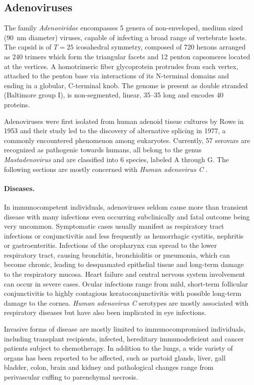 \subsection{Adenoviruses}
The family \textit{Adenoviridae} encompasses 5 genera of non-enveloped, medium sized (\SI{90}{\nano\meter} diameter) viruses, capable of infecting a broad range of vertebrate hosts. The capsid is of $T=25$ icosahedral symmetry, composed of 720 hexons arranged as 240 trimers which form the triangular facets and 12 penton capsomeres located at the vertices. A homotrimeric fiber glycoprotein protrudes from each vertex, attached to the penton base via interactions of its N-terminal domains and ending in a globular, C-terminal knob. The genome is present as double stranded  (Baltimore group I), is non-segmented, linear, 35--\SI{35}{\kilobase} long and encodes 40 proteins.

Adenoviruses were first isolated from human adenoid tissue cultures by Rowe in 1953 and their study led to the discovery of alternative splicing in 1977, a commonly encountered phenomenon among eukaryotes. Currently, 57 serovars are recognized as pathogenic towards humans, all belong to the genus \textit{Mastadenovirus} and are classified into 6 species, labeled A through G. The following sections are mostly concerned with \textit{Human adenovirus C} \citep{Lenaerts2008}.

\paragraph{Diseases.}
In immunocompetent individuals, adenoviruses seldom cause more than transient disease with many infections even occurring subclinically and fatal outcome being very uncommon. Symptomatic cases usually manifest as respiratory tract infections or conjunctivitis and less frequently as hemorrhagic cystitis, nephritis or gastroenteritis. Infections of the oropharynx can spread to the lower respiratory tract, causing bronchitis, bronchiolitis or pneumonia, which can become chronic, leading to desquamated epithelial tissue and long-term damage to the respiratory mucosa. Heart failure and central nervous system involvement can occur in severe cases. Ocular infections range from mild, short-term follicular conjunctivitis to highly contagious keratoconjunctivitis with possible long-term damage to the cornea. \textit{Human adenovirus C} serotypes are mostly associated with respiratory diseases but have also been implicated in eye infections.

Invasive forms of disease are mostly limited to immunocompromised individuals, including transplant recipients,  infected, hereditary immunodeficient and cancer patients subject to chemotherapy. In addition to the lungs, a wide variety of organs has been reported to be affected, such as partoid glands, liver, gall bladder, colon, brain and kidney and pathological changes range from perivascular cuffing to parenchymal necrosis.


